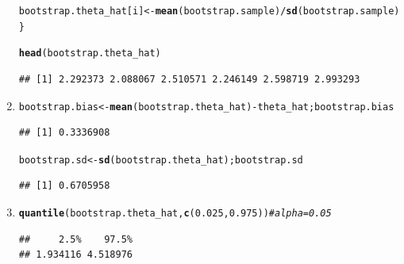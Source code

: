 \documentclass[11pt, a4paper]{article}\usepackage[]{graphicx}\usepackage[]{xcolor}
\makeatletter
\newcommand{\hlnum}[1]{\textcolor[rgb]{0.686,0.059,0.569}{#1}}%
\newcommand{\hlcom}[1]{\textcolor[rgb]{0.678,0.584,0.686}{\textit{#1}}}%
\newcommand{\hlopt}[1]{\textcolor[rgb]{0,0,0}{#1}}%
\newcommand{\hldef}[1]{\textcolor[rgb]{0.345,0.345,0.345}{#1}}%
\newcommand{\hlkwb}[1]{\textcolor[rgb]{0.69,0.353,0.396}{#1}}%
\newcommand{\hlkwd}[1]{\textcolor[rgb]{0.737,0.353,0.396}{\textbf{#1}}}%
\newenvironment{kframe}{%
 \def\at@end@of@kframe{}%
 \ifinner\ifhmode%
  \def\at@end@of@kframe{\end{minipage}}%
  \begin{minipage}{\columnwidth}%
 \fi\fi%
 \def\FrameCommand##1{\hskip\@totalleftmargin \hskip-\fboxsep
 \colorbox{shadecolor}{##1}\hskip-\fboxsep
     \hskip-\linewidth \hskip-\@totalleftmargin \hskip\columnwidth}%
 \MakeFramed {\advance\hsize-\width
   \@totalleftmargin\z@ \linewidth\hsize
   \@setminipage}}%
 {\par\unskip\endMakeFramed%
 \at@end@of@kframe}
\newenvironment{knitrout}{}{} %
\makeatother
\begin{document}
\begin{enumerate}
\begin{knitrout}
\begin{kframe}
\begin{alltt}
  \hldef{bootstrap.theta_hat[i]} \hlkwb{<-} \hlkwd{mean}\hldef{(bootstrap.sample)} \hlopt{/} \hlkwd{sd}\hldef{(bootstrap.sample)}
\hldef{\}}

\hlkwd{head}\hldef{(bootstrap.theta_hat)}
\end{alltt}
\begin{verbatim}
## [1] 2.292373 2.088067 2.510571 2.246149 2.598719 2.993293
\end{verbatim}
\end{kframe}
\end{knitrout}

\item[\scalebox{2.0}{\twemoji{keycap: 2}}]

\begin{knitrout}
\color{fgcolor}\begin{kframe}
\begin{alltt}
\hldef{bootstrap.bias} \hlkwb{<-} \hlkwd{mean}\hldef{(bootstrap.theta_hat)} \hlopt{-} \hldef{theta_hat; bootstrap.bias}
\end{alltt}
\begin{verbatim}
## [1] 0.3336908
\end{verbatim}
\end{kframe}
\end{knitrout}

\begin{knitrout}
\color{fgcolor}\begin{kframe}
\begin{alltt}
\hldef{bootstrap.sd} \hlkwb{<-} \hlkwd{sd}\hldef{(bootstrap.theta_hat); bootstrap.sd}
\end{alltt}
\begin{verbatim}
## [1] 0.6705958
\end{verbatim}
\end{kframe}
\end{knitrout}

\item[\scalebox{2.0}{\twemoji{keycap: 3}}]

\begin{knitrout}
\color{fgcolor}\begin{kframe}
\begin{alltt}
\hlkwd{quantile}\hldef{(bootstrap.theta_hat,} \hlkwd{c}\hldef{(}\hlnum{0.025}\hldef{,} \hlnum{0.975}\hldef{))} \hlcom{# alpha = 0.05}
\end{alltt}
\begin{verbatim}
##     2.5%    97.5% 
## 1.934116 4.518976
\end{verbatim}
\end{kframe}
\end{knitrout}


\end{enumerate}
\end{document}
